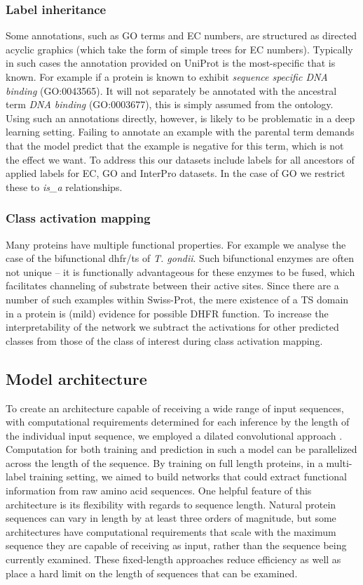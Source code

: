 \subsubsection*{Label inheritance}
Some annotations, such as GO terms and EC numbers, are structured as directed acyclic graphics (which take the form of simple trees for EC numbers). Typically in such cases the annotation provided on UniProt is the most-specific that is known. For example if a protein is known to exhibit \textit{sequence specific DNA binding} (GO:0043565). It will not separately be annotated with the ancestral term \textit{DNA binding} (GO:0003677), this is simply assumed from the ontology. Using such an annotations directly, however, is likely to be problematic in a deep learning setting. Failing to annotate an example with the parental term demands that the model predict that the example is negative for this term, which is not the effect we want.
To address this our datasets include labels for all ancestors of applied labels for EC, GO and InterPro datasets. In the case of GO we restrict these to \textit{is\_a} relationships.

\subsubsection*{Class activation mapping}
Many proteins have multiple functional properties. For example we analyse the case of the bifunctional dhfr/ts of \textit{T. gondii}. Such bifunctional enzymes are often not unique -- it is functionally advantageous for these enzymes to be fused, which facilitates channeling of substrate between their active sites. Since there are a number of such examples within Swiss-Prot, the mere existence of a TS domain in a protein is (mild) evidence for possible DHFR function. To increase the interpretability of the network we subtract the activations for other predicted classes from those of the class of interest during class activation mapping. 


\subsection*{Model architecture}
To create an architecture capable of receiving a wide range of input sequences, with computational requirements determined for each inference by the length of the individual input sequence, we employed a dilated convolutional approach \citep{dilatedconvolutions}. Computation for both training and prediction in such a model can be parallelized across the length of the sequence. By training on full length proteins, in a multi-label training setting, we aimed to build networks that could  extract functional information from raw amino acid sequences. One helpful feature of this architecture is its flexibility with regards to sequence length. Natural protein sequences can vary in length by at least three orders of magnitude, but some architectures have computational requirements that scale with the maximum sequence they are capable of receiving as input, rather than the sequence being currently examined. These fixed-length approaches reduce efficiency as well as place a hard limit on the length of sequences that can be examined. 

